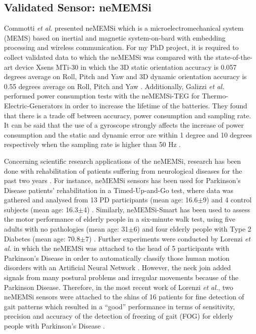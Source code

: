 \documentclass[9pt,journal,onecolumn,compsoc]{IEEEtran}
\begin{document}
\subsection{Validated Sensor: neMEMSi}

Commotti \textit{et al.} presented neMEMSi which is a microelectromechanical system (MEMS)  based on 
inertial and magnetic system-on-bard with embedding processing and wireless communication.
For my PhD project, it is required to collect validated data to which  
the neMEMSi was compared with the state-of-the-art device Xsens MTi-30
in which the 3D static orientation accuracy is 0.057 degrees average on Roll, Pitch and Yaw 
and 3D dynamic orientation accuracy is 0.55 degrees average on Roll, Pitch and Yaw \cite{Comotti2014}.
Additionally, Galizzi \textit{et al.} performed power consumption tests with the 
neMEMSi-TEG for Thermo-Electric-Generators in order to increase the lifetime of the batteries.
They found that there is a trade off between accuracy, power consumption and sampling rate.
It can be said that the use of a gyroscope strongly affects the increase of power consumption
and the static and dynamic error are within 1 degree and 10 degrees respectively 
when the sampling rate is higher than 50 Hz \cite{Galizzi2015}.

Concerning scientific research applications of the neMEMSi, 
research has been done with rehabilitation of patients suffering from neurological diseases
for the past two years \cite{Caldara2014, Caldara2015, Lorenzi2015, Lorenzi2016}. 
For instance, neMEMSi sensors has been used for Parkinson's Disease patients' rehabilitation 
in a Timed-Up-and-Go test, where data was gathered and analysed from 
13 PD participants (mean age: 16.6$\pm$9) and 4 control subjects (mean age: 16.3$\pm$4) \cite{Caldara2014}.
Similarly, neMEMSi-Smart has been used to assess the motor performance of elderly people
in a six-minute walk test, using five adults with no pathologies (mean age: 31$\pm$6) and four elderly people with Type 2 Diabetes 
(mean age: 70.8$\pm$7) \cite{Caldara2015}.
Further experiments were conducted by Lorenzi \textit{et al.} in which the neMEMSi was attached to the head 
of 5 participants  with Parkinson's Disease in order to 
automatically classify those human motion disorders with an Artificial Neural Network \cite{Lorenzi2015}.
However, the neck join added signals from many postural problems
and irregular movements because of the Parkinson Disease.
Therefore, in the most recent work of Lorenzi \textit{et al.}, two neMEMSi sensors were attached to the shins
of 16 patients for fine detection of gait patterns
which resulted in a ``good'' performance in terms of sensitivity, precision and accuracy of 
the detection of freezing of gait (FOG) for elderly people with Parkinson's Disease  \cite{Lorenzi2016}.
\end{document}
